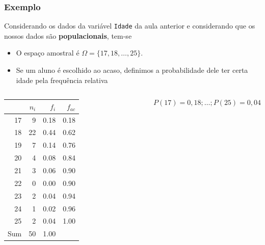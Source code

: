 \documentclass[11pt]{beamer}
\newcommand\Fontvi{\fontsize{8}{7.2}\selectfont}
\begin{document}
\begin{frame}
\frametitle{Exemplo}
\Fontvi
Considerando os dados da variável \texttt{Idade} da aula anterior e
considerando que os nossos dados são \textbf{populacionais}, tem-se

\begin{itemize}
\item
  O espaço amostral é \(\Omega = \{17, 18, \ldots, 25\}\).
\item
  Se um aluno é escolhido ao acaso, definimos a probabilidade dele ter
  certa idade pela frequência relativa
\end{itemize}

\begin{columns}

\begin{table}[ht]
\centering
\begin{tabular}{rrrr}
  \hline
 & $n_i$ & $f_i$ & $f_{ac}$ \\ 
  \hline
17 & 9 & 0.18 & 0.18 \\ 
  18 & 22 & 0.44 & 0.62 \\ 
  19 & 7 & 0.14 & 0.76 \\ 
  20 & 4 & 0.08 & 0.84 \\ 
  21 & 3 & 0.06 & 0.90 \\ 
  22 & 0 & 0.00 & 0.90 \\ 
  23 & 2 & 0.04 & 0.94 \\ 
  24 & 1 & 0.02 & 0.96 \\ 
  25 & 2 & 0.04 & 1.00 \\ 
   \hline
Sum & 50 & 1.00 &  \\ 
   \hline
\end{tabular}
\end{table}

\normalsize {} \[
P(17) = 0,18; \ldots; P(25) = 0,04
\]
\end{columns}
\end{frame}
\end{document}
